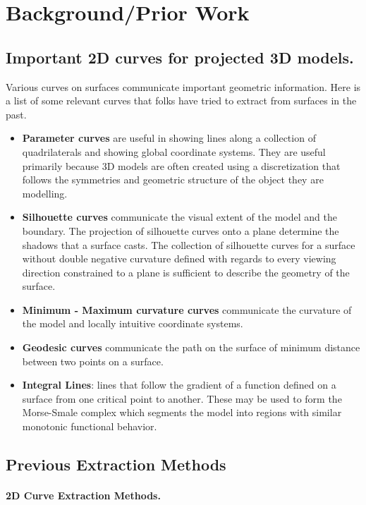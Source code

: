 \documentclass[12pt, letterpaper]{article}
\begin{document}
\section{Background/Prior Work}

	\subsection{Important 2D curves for projected 3D models.}

		Various curves on surfaces communicate important geometric information. Here is a list of some relevant curves that folks have
		tried to extract from surfaces in the past.

\begin{itemize}
	\item 	\textbf{Parameter curves} are useful in showing lines along a collection of quadrilaterals and showing global coordinate systems.
			They are useful primarily because 3D models are often created using a discretization that follows the symmetries and geometric structure
			of the object they are modelling.
	\item 	\textbf{Silhouette curves} communicate the visual extent of the model and the boundary.
			The projection of silhouette curves onto a plane determine the shadows that a surface casts.
			The collection of silhouette curves for a surface without double negative curvature defined with regards to every viewing direction constrained to a plane
			is sufficient to describe the geometry of the surface.
	\item 	\textbf{Minimum - Maximum curvature curves} communicate the curvature of the model and locally intuitive coordinate systems.
	\item        \textbf{Geodesic curves} communicate the path on the surface of minimum distance between two points on a surface.
	\item 	\textbf{Integral Lines}: lines that follow the gradient of a function defined on a surface from one critical point to another. These may be used to form the Morse-Smale complex
			which segments the model into regions with similar monotonic functional behavior.
\end{itemize}

	\subsection{Previous Extraction Methods}

	\paragraph{2D Curve Extraction Methods.}
\end{document}
